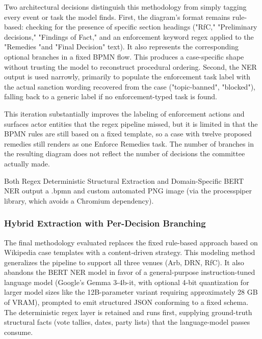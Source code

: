 \documentclass[conference]{IEEEtran}
\begin{document}
Two architectural decisions distinguish this methodology from simply tagging every event or task the model finds. First, the diagram's format remains rule-based: checking for the presence of specific section headings ("RfC," "Preliminary decisions," "Findings of Fact," and an enforcement keyword regex applied to the "Remedies "and "Final Decision" text). It also represents the corresponding optional branches in a fixed BPMN flow. This produces a case-specific shape without trusting the model to reconstruct procedural ordering. Second, the NER output is used narrowly, primarily to populate the enforcement task label with the actual sanction wording recovered from the case ("topic-banned", "blocked"), falling back to a generic label if no enforcement-typed task is found.

This iteration substantially improves the labeling of enforcement actions and surfaces actor entities that the regex pipeline missed, but it is limited in that the BPMN rules are still based on a fixed template, so a case with twelve proposed remedies still renders as one Enforce Remedies task. The number of branches in the resulting diagram does not reflect the number of decisions the committee actually made.

Both Regex Deterministic Structural Extraction and Domain-Specific BERT NER output a .bpmn and custom automated PNG image (via the processpiper library, which avoids a Chromium dependency).

\subsubsection{Hybrid Extraction with Per-Decision Branching}
The final methodology evaluated replaces the fixed rule-based approach based on Wikipedia case templates with a content-driven strategy. This modeling method generalizes the pipeline to support all three venues (Arb, DRN, RfC). It also abandons the BERT NER model in favor of a general-purpose instruction-tuned language model (Google's Gemma 3-4b-it, with optional 4-bit quantization for larger model sizes like the 12B-parameter variant requiring approximately 28 GB of VRAM), prompted to emit structured JSON conforming to a fixed schema. The deterministic regex layer is retained and runs first, supplying ground-truth structural facts (vote tallies, dates, party lists) that the language-model passes consume.
\end{document}
